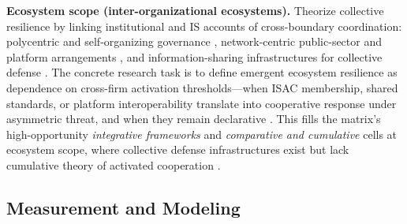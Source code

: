 \textbf{Ecosystem scope (inter-organizational ecosystems).} Theorize collective resilience by linking institutional and IS accounts of cross-boundary coordination: polycentric and self-organizing governance \autocite{ostrom1990governing}, network-centric public-sector and platform arrangements \autocite{janssen2006network,liu2022network}, and information-sharing infrastructures for collective defense \autocite{arnold2004informationsharing,lostri2022shared}. The concrete research task is to define emergent ecosystem resilience as dependence on cross-firm activation thresholds---when ISAC membership, shared standards, or platform interoperability translate into cooperative response under asymmetric threat, and when they remain declarative \autocite{arnold2004informationsharing,bjorck2015cyber,enisa2017isacs,mermoud2019share}. This fills the matrix's high-opportunity \emph{integrative frameworks} and \emph{comparative and cumulative} cells at ecosystem scope, where collective defense infrastructures exist but lack cumulative theory of activated cooperation \autocite{skopik2016problem}.

\subsection{Measurement and Modeling}


